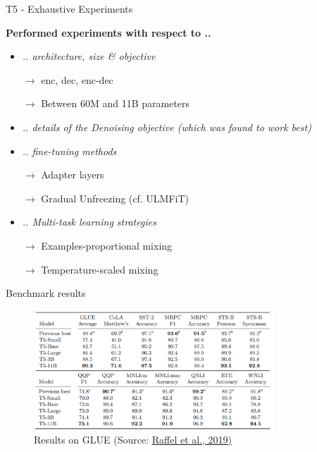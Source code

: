 \begin{frame}{T5 - Exhaustive Experiments}

\vfill

	\textbf{Performed experiments with respect to ..}
	
	\begin{itemize}
		\item \textit{.. architecture, size \& objective}
		\item[$\to$] enc, dec, enc-dec
		\item[$\to$] Between 60M and 11B parameters
		\item \textit{.. details of the Denoising objective (which was found to work best)}
		\item \textit{.. fine-tuning methods}
		\item[$\to$] Adapter layers
		\item[$\to$] Gradual Unfreezing (cf. ULMFiT)
		\item \textit{.. Multi-task learning strategies}
		\item[$\to$] Examples-proportional mixing
		\item[$\to$] Temperature-scaled mixing
	\end{itemize}
	
\vfill

\end{frame}


\begin{frame}{Benchmark results}

\vfill

	\begin{figure}
		\centering
		\includegraphics[width = 9cm]{figure/63-t5-glue.png}\\ 
		\footnotesize{Results on GLUE (Source:} \href{https://arxiv.org/pdf/1910.10683.pdf}{\footnotesize Raffel et al., 2019)}
	\end{figure}
	
\vfill

\end{frame}

